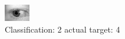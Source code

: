 \begin{figure}[h!]
\begin{center}
\includegraphics[width=0.60\columnwidth]{figures/ID786_class_2_target_4.png}
\end{center}
\caption{ Classification: 2 actual target: 4}
\label{fig:ID786_class_2_target_4}
\end{figure}
